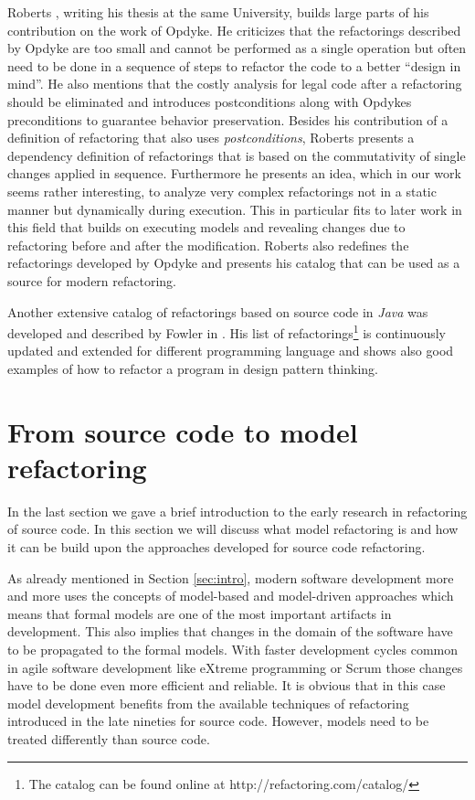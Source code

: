 \documentclass{llncs}
\begin{document}
Roberts \cite{rob99}, writing his thesis at the same University, builds large parts of his contribution on the work of
Opdyke. He criticizes that the refactorings described by Opdyke are too small and cannot be performed as a single
operation but often need to be done in a sequence of steps to refactor the code to a better ``design in mind''.  He also mentions
that the costly analysis for legal code after a refactoring should be eliminated and introduces postconditions along
with Opdykes preconditions to guarantee behavior preservation. Besides his contribution of a definition of refactoring
that also uses \textit{postconditions}, Roberts presents a dependency definition of refactorings that is based on the
commutativity of single changes applied in sequence. Furthermore he presents an idea, which in our work seems rather interesting,
to analyze very complex refactorings not in a static manner but dynamically during execution. This in
particular fits to later work in this field that builds on executing models and revealing changes due to refactoring before
and after the modification. Roberts also redefines the refactorings developed by Opdyke and presents his catalog that
can be used as a source for modern refactoring.

Another extensive catalog of refactorings based on source code in \textit{Java} was developed and
described by Fowler in \cite{fow99}. His list of refactorings\footnote{The catalog can be found online at
http://refactoring.com/catalog/} is continuously updated and extended for different programming language and shows also
good examples of how to refactor a program in design pattern thinking.

\section{From source code to model refactoring}
\label{sec:fromto}

In the last section we gave a brief introduction to the early research in refactoring of source code. In this section we will discuss
what model refactoring is and how it can be build upon the approaches developed for source code refactoring. 

As already mentioned in Section
\ref{sec:intro}, modern software development more and more uses the concepts of model-based and model-driven approaches
which means that formal models are one of the most important artifacts in development. This also implies that changes in
the domain of the software have to be propagated to the formal models. With faster development cycles common in agile
software development like eXtreme programming \cite{DBLP:journals/computer/Beck99} or Scrum
\cite{DBLP:journals/software/RisingJ00} those changes have to be done even more efficient and reliable. It is obvious
that in this case model development benefits from the available techniques of refactoring introduced in the late nineties for
source code. However, models need to be treated differently than source code.
\end{document}
